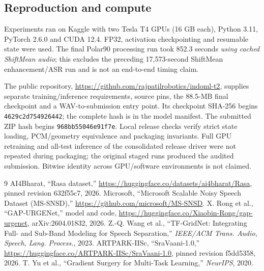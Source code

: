 \documentclass[conference]{IEEEtran}
\begin{document}
\subsection{Reproduction and compute}
Experiments ran on Kaggle with two Tesla T4 GPUs (16 GB each), Python 3.11, PyTorch 2.6.0 and CUDA 12.4. FP32, activation checkpointing and resumable state were used. The final Polar90 processing run took 852.3 seconds \emph{using cached ShiftMean audio}; this excludes the preceding 17,573-second ShiftMean enhancement/ASR run and is not an end-to-end timing claim.

The public repository, \url{https://github.com/rajpatilrobotics/indoml-t2}, supplies separate training/inference requirements, source pins, the 88.5-MB final checkpoint and a WAV-to-submission entry point. Its checkpoint SHA-256 begins \texttt{4629c2d754926442}; the complete hash is in the model manifest. The submitted ZIP hash begins \texttt{968bb55046e91f7e}. Local release checks verify strict state loading, PCM/geometry equivalence and packaging invariants. Full GPU retraining and all-test inference of the consolidated release driver were not repeated during packaging; the original staged runs produced the audited submission. Bitwise identity across GPU/software environments is not claimed.

\balance
\begin{thebibliography}{9}
 AI4Bharat, ``Rasa dataset,'' \url{https://huggingface.co/datasets/ai4bharat/Rasa}, pinned revision 632f55c7, 2026.
 Microsoft, ``Microsoft Scalable Noisy Speech Dataset (MS-SNSD),'' \url{https://github.com/microsoft/MS-SNSD}.
 X. Rong et al., ``GAP-URGENet,'' model and code, \url{https://huggingface.co/Xiaobin-Rong/gap-urgenet}, arXiv:2604.01832, 2026.
 Z.-Q. Wang et al., ``TF-GridNet: Integrating Full- and Sub-Band Modeling for Speech Separation,'' \emph{IEEE/ACM Trans. Audio, Speech, Lang. Process.}, 2023.
 ARTPARK-IISc, ``SraVaani-1.0,'' \url{https://huggingface.co/ARTPARK-IISc/SraVaani-1.0}, pinned revision f5dd5358, 2026.
 T. Yu et al., ``Gradient Surgery for Multi-Task Learning,'' \emph{NeurIPS}, 2020.
\end{thebibliography}
\end{document}
